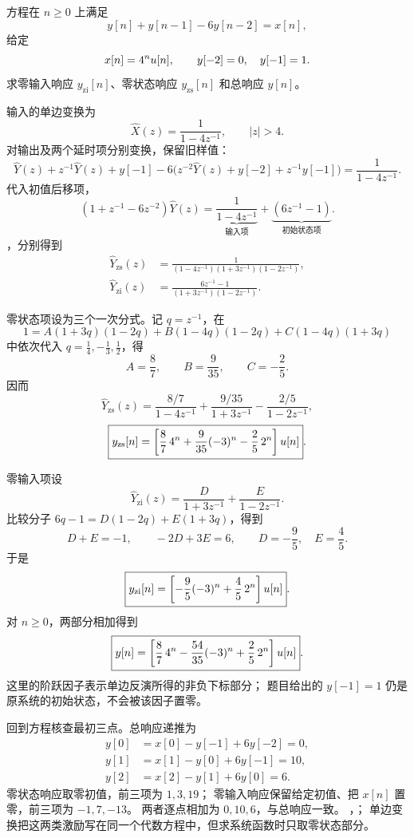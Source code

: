 \begin{example}
\label{eg:z-unilateral-total-response}
  方程在 $n\geq0$ 上满足
  \[
    y[n]+y[n-1]-6y[n-2]=x[n],
  \]
  给定
  \[
    x[n]=4^nu[n],\qquad y[-2]=0,\quad y[-1]=1.
  \]
  求零输入响应 $y_{\mathrm{zi}}[n]$、零状态响应
  $y_{\mathrm{zs}}[n]$ 和总响应 $y[n]$。

  输入的单边变换为
  \[
    \widehat X(z)=\frac1{1-4z^{-1}},\qquad |z|>4.
  \]
  对输出及两个延时项分别变换，保留旧样值：
  \[
    \widehat Y(z)+z^{-1}\widehat Y(z)+y[-1]
    -6\bigl(z^{-2}\widehat Y(z)+y[-2]+z^{-1}y[-1]\bigr)
    =\frac1{1-4z^{-1}}.
  \]
  代入初值后移项，
  \[
    (1+z^{-1}-6z^{-2})\widehat Y(z)
    =\underbrace{\frac1{1-4z^{-1}}}_{\text{输入项}}
      +\underbrace{(6z^{-1}-1)}_{\text{初始状态项}}.
  \]
  ，分别得到
  \begin{align*}
    \widehat Y_{\mathrm{zs}}(z)
      &=\frac1{(1-4z^{-1})(1+3z^{-1})(1-2z^{-1})},\\
    \widehat Y_{\mathrm{zi}}(z)
      &=\frac{6z^{-1}-1}{(1+3z^{-1})(1-2z^{-1})}.
  \end{align*}

  零状态项设为三个一次分式。记 $q=z^{-1}$，在
  \[
    1=A(1+3q)(1-2q)+B(1-4q)(1-2q)+C(1-4q)(1+3q)
  \]
  中依次代入 $q=\frac14,-\frac13,\frac12$，得
  \[
    A=\frac87,\qquad B=\frac9{35},\qquad C=-\frac25.
  \]
  因而
  \[
    \widehat Y_{\mathrm{zs}}(z)
    =\frac{8/7}{1-4z^{-1}}+\frac{9/35}{1+3z^{-1}}
       -\frac{2/5}{1-2z^{-1}},
  \]
  \[
    \boxed{y_{\mathrm{zs}}[n]
      =\left[\frac87\,4^n+\frac9{35}(-3)^n-\frac25\,2^n\right]u[n]}.
  \]

  零输入项设
  \[
    \widehat Y_{\mathrm{zi}}(z)
      =\frac{D}{1+3z^{-1}}+\frac{E}{1-2z^{-1}}.
  \]
  比较分子 $6q-1=D(1-2q)+E(1+3q)$，得到
  \[
    D+E=-1,\qquad -2D+3E=6,
    \qquad D=-\frac95,\quad E=\frac45.
  \]
  于是
  \[
    \boxed{y_{\mathrm{zi}}[n]
      =\left[-\frac95(-3)^n+\frac45\,2^n\right]u[n]}.
  \]
  对 $n\geq0$，两部分相加得到
  \[
    \boxed{y[n]
      =\left[\frac87\,4^n-\frac{54}{35}(-3)^n+\frac25\,2^n\right]u[n]}.
  \]
  这里的阶跃因子表示单边反演所得的非负下标部分；
  题目给出的 $y[-1]=1$ 仍是原系统的初始状态，不会被该因子置零。

  回到方程核查最初三点。总响应递推为
  \begin{align*}
    y[0]&=x[0]-y[-1]+6y[-2]=0,\\
    y[1]&=x[1]-y[0]+6y[-1]=10,\\
    y[2]&=x[2]-y[1]+6y[0]=6.
  \end{align*}
  零状态响应取零初值，前三项为 $1,3,19$；
  零输入响应保留给定初值、把 $x[n]$ 置零，前三项为 $-1,7,-13$。
  两者逐点相加为 $0,10,6$，与总响应一致。
  ，；
  单边变换把这两类激励写在同一个代数方程中，但求系统函数时只取零状态部分。
\end{example}
